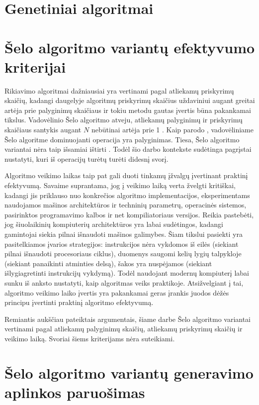 \documentclass{VUMIFInfKursinis}
\begin{document}
\section{Genetiniai algoritmai}


\section{Šelo algoritmo variantų efektyvumo kriterijai}

Rikiavimo algoritmai dažniausiai yra vertinami pagal atliekamų priskyrimų skaičių, kadangi
daugelyje algoritmų priskyrimų skaičius uždaviniui augant greitai artėja prie palyginimų skaičiaus ir
tokiu metodu gautas įvertis būna pakankamai tikslus.
Vadovėlinio Šelo algoritmo atveju, atliekamų palyginimų ir priskyrimų skaičiaus santykis augant $N$ nebūtinai artėja prie 1 \cite{Radavičius_Baranauskas_2013}.
Kaip parodo \cite{ciura2001best}, vadovėliniame Šelo algoritme dominuojanti operacija yra palyginimas.
Tiesa, Šelo algoritmo variantai nėra taip išsamiai ištirti \cite{brejova2001analyzing}.
Todėl šio darbo kontekste sudėtinga pagrįstai nustatyti, kuri iš operacijų turėtų turėti didesnį svorį.

Algoritmo veikimo laikas taip pat gali duoti tinkamų įžvalgų įvertinant praktinį efektyvumą.
Savaime suprantama, jog į veikimo laiką verta žvelgti kritiškai, kadangi jis priklauso nuo konkrečios algoritmo implementacijos,
eksperimentams naudojamos mašinos architektūros ir techninių parametrų, operacinės sistemos, pasirinktos programavimo kalbos ir net kompiliatoriaus versijos.
Reikia pastebėti, jog šiuolaikinių kompiuterių architektūros yra labai sudėtingos, kadangi gamintojai siekia pilnai išnaudoti mašinos galimybes.
Šiam tikslui pasiekti yra pasitelkiamos įvarios strategijos:
instrukcijos nėra vykdomos iš eilės (siekiant pilnai išnaudoti procesoriaus ciklus),
duomenys saugomi kelių lygių talpykloje (siekiant panaikinti atminties delsą),
šakos yra nuspėjamos (siekiant išlygiagretinti instrukcijų vykdymą).
Todėl naudojant modernų kompiuterį labai sunku iš anksto nustatyti, kaip algoritmas veiks praktikoje.
Atsižvelgiant į tai, algoritmo veikimo laiko įvertis yra pakankamai geras įrankis juodos dėžės principu įvertinti praktinį algoritmo efektyvumą.

Remiantis aukščiau pateiktais argumentais, šiame darbe Šelo algoritmo variantai vertinami pagal
atliekamų palyginimų skaičių, atliekamų priskyrimų skaičių ir veikimo laiką.
Svoriai šiems kriterijams nėra suteikiami.

\section{Šelo algoritmo variantų generavimo aplinkos paruošimas}
\end{document}
